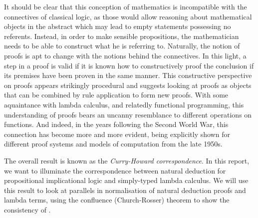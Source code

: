 It should be clear that this conception of mathematics is incompatible with the
connectives of classical logic, as those would allow reasoning about
mathematical objects in the abstract which may lead to empty statements
possessing no referents. Instead, in order to make sensible propositions, the
mathematician needs to be able to construct what he is referring to. Naturally,
the notion of proofs is apt to change with the notions behind the connectives.
In this light, a step in a proof is valid if it is known how to constructively
proof the conclusion if its premises have been proven in the same manner. This
constructive perspective on proofs appears strikingly procedural and suggests
looking at proofs as objects that can be combined by rule application to form
new proofs. With some aquaintance with lambda calculus, and relatedly functional
programming, this understanding of proofs bears an uncanny resemblance to
different operations on functions. And indeed, in the years following the Second
World War, this connection has become more and more evident, being explicitly
shown for different proof systems and models of computation from the late 1950s.

The overall result is known as the \textit{Curry-Howard correspondence}. In this
report, we want to illuminate the correspondence between natural deduction for
propositional implicational logic and simply-typed lambda calculus. We will use
this result to look at parallels in normalisation of natural deduction proofs
and lambda terms, using the confluence (Church-Rosser) theorem to show the
consistency of \implnpi.
